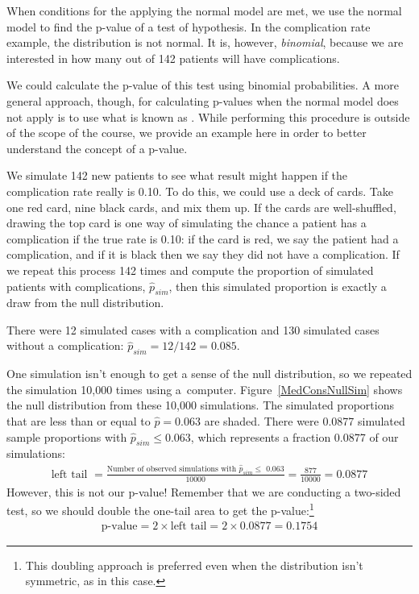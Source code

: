 When conditions for the applying the normal model are met, we use the normal model to find the p-value of a test of hypothesis. In the complication rate example, the distribution is not normal. It is, however, \emph{binomial}, because we are interested in how many out of 142 patients will have complications.

We could calculate the p-value of this test using binomial probabilities. A more general approach, though, for calculating p-values when the normal model does not apply is to use what is known as . While performing this procedure is outside of the scope of the course, we provide an example here in order to better understand the concept of a p-value.

We simulate 142 new patients to see what result might happen if the complication rate really is 0.10. To do this, we could use a deck of cards. Take one red card, nine black cards, and mix them up. If the cards are well-shuffled, drawing the top card is one way of simulating the chance a patient has a complication if the true rate is 0.10: if the card is red, we say the patient had a complication, and if it is black then we say they did not have a complication. If we repeat this process 142 times and compute the proportion of simulated patients with complications, $\hat{p}_{sim}$, then this simulated proportion is exactly a draw from the null distribution.

There were 12 simulated cases with a complication and 130 simulated cases without a complication: $\hat{p}_{sim} = 12 / 142 = 0.085$.

One simulation isn't enough to get a sense of the null distribution, so we repeated the simulation 10,000 times using a~computer. Figure~\ref{MedConsNullSim} shows the null distribution from these 10,000 simulations. The simulated proportions that are less than or equal to $\hat{p}=0.063$ are shaded. There were 0.0877 simulated sample proportions with $\hat{p}_{sim} \leq 0.063$, which represents a fraction 0.0877 of our simulations:
\begin{align*}
\text{left tail }
	= \frac{\text{Number of observed simulations with }\hat{p}_{sim}\leq\text{ 0.063}}{10000}
	= \frac{877}{10000} = 0.0877
\end{align*}
However, this is not our p-value! Remember that we are conducting a two-sided test, so we should double the one-tail area to get the p-value:\footnote{This doubling approach is preferred even when the distribution isn't symmetric, as in this case.}
\begin{align*}
\text{p-value} = 2 \times \text{left tail} = 2 \times 0.0877 = 0.1754
\end{align*}

